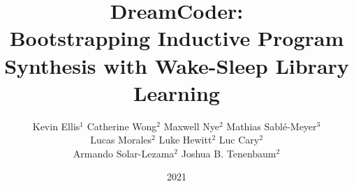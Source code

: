 \documentclass{beamer}
\title{DreamCoder:\\Bootstrapping Inductive Program Synthesis with Wake-Sleep Library Learning}
\author{Kevin Ellis$^1$ Catherine Wong$^2$ Maxwell Nye$^2$ Mathias Sabl\'e-Meyer$^3$\\  Lucas Morales$^2$ Luke Hewitt$^2$ Luc Cary$^2$\\Armando Solar-Lezama$^2$ Joshua B. Tenenbaum$^2$}
\institute{PLDI. $^1$Cornell; $^2$MIT; $^3$PSL/Collège de France \& NeuroSpin}
\date{2021}
\newcommand{\1}[1]{\mathds{1}\left[#1\right]}
\newcommand\Wider[2][3em]{%
\makebox[\linewidth][c]{%
  \begin{minipage}{\dimexpr\textwidth+#1\relax}
  \raggedright#2
  \end{minipage}%
  }%
}
\begin{document}
 
\frame{\titlepage}







\end{document}
